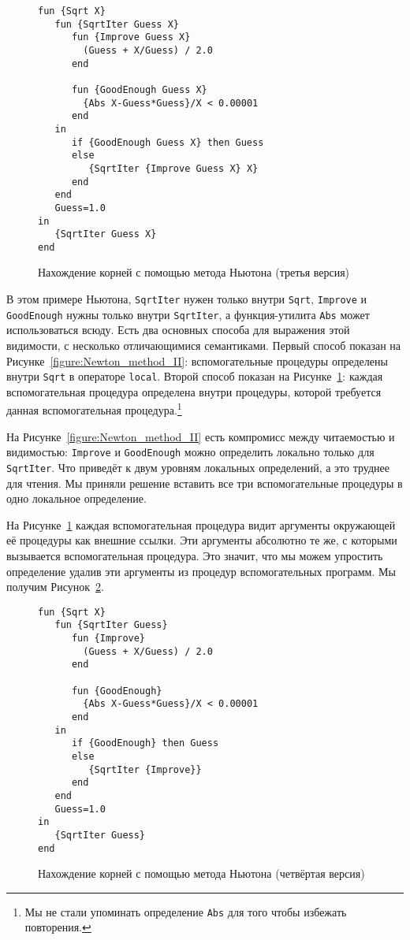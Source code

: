 \begin{figure}
  \begin{lstlisting}
fun {Sqrt X}
   fun {SqrtIter Guess X}
      fun {Improve Guess X}
        (Guess + X/Guess) / 2.0
      end

      fun {GoodEnough Guess X}
        {Abs X-Guess*Guess}/X < 0.00001
      end
   in
      if {GoodEnough Guess X} then Guess
      else
         {SqrtIter {Improve Guess X} X}
      end
   end
   Guess=1.0
in
   {SqrtIter Guess X}
end
  \end{lstlisting}
  \caption{Нахождение корней с помощью метода Ньютона (третья версия)}
  \label{figure:Newton_method_III}
\end{figure}

В этом примере Ньютона, \lstinline!SqrtIter! нужен только внутри \lstinline!Sqrt!, \lstinline!Improve! и \lstinline!GoodEnough! нужны только внутри \lstinline!SqrtIter!, а функция-утилита \lstinline!Abs! может использоваться всюду. Есть два основных способа для выражения этой видимости, с несколько отличающимися семантиками. Первый способ показан на Рисунке~\ref{figure:Newton_method_II}: вспомогательные процедуры определены внутри \lstinline!Sqrt! в операторе \lstinline!local!. Второй способ показан на Рисунке~\ref{figure:Newton_method_III}: каждая вспомогательная процедура определена внутри процедуры, которой требуется данная вспомогательная процедура.\footnote{Мы не стали упоминать определение \lstinline!Abs! для того чтобы избежать повторения.}

На Рисунке~\ref{figure:Newton_method_II} есть компромисс между читаемостью и видимостью: \lstinline!Improve! и \lstinline!GoodEnough! можно определить локально только для \lstinline!SqrtIter!. Что приведёт к двум уровням локальных определений, а это труднее для чтения. Мы приняли решение вставить все три вспомогательные процедуры в одно локальное определение.

На Рисунке~\ref{figure:Newton_method_III} каждая вспомогательная процедура видит аргументы окружающей её процедуры как внешние ссылки. Эти аргументы абсолютно те же, с которыми вызывается вспомогательная процедура. Это значит, что мы можем упростить определение удалив эти аргументы из процедур вспомогательных программ. Мы получим Рисунок~\ref{figure:Newton_method_IV}.

\begin{figure}
  \begin{lstlisting}
fun {Sqrt X}
   fun {SqrtIter Guess}
      fun {Improve}
        (Guess + X/Guess) / 2.0
      end

      fun {GoodEnough}
        {Abs X-Guess*Guess}/X < 0.00001
      end
   in
      if {GoodEnough} then Guess
      else
         {SqrtIter {Improve}}
      end
   end
   Guess=1.0
in
   {SqrtIter Guess}
end
  \end{lstlisting}
  \caption{Нахождение корней с помощью метода Ньютона (четвёртая версия)}
  \label{figure:Newton_method_IV}
\end{figure}

